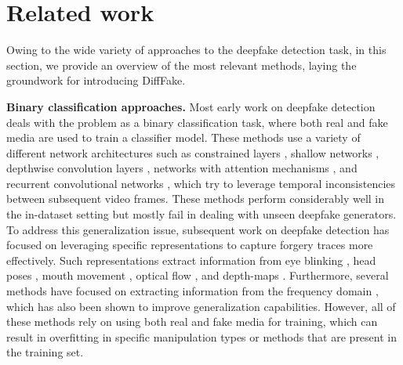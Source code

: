 \section{Related work}
Owing to the wide variety of approaches to the deepfake detection task, in this section, we provide an overview of the most relevant methods, laying the groundwork for introducing DiffFake. 



\noindent\textbf{Binary classification approaches.} Most early work on deepfake detection deals with the problem as a binary classification task, where both real and fake media are used to train a classifier model. These methods use a variety of different network architectures such as constrained layers \cite{bayar2016deep_constrained_layers}, shallow networks \cite{afchar2018mesonet}, depthwise convolution layers \cite{rossler2019faceforensics++}, networks with attention mechanisms \cite{dang2020detection_attention,zhao2021multi}, and recurrent convolutional networks \cite{sabir2019recurrent,guera2018deepfake_recurrent}, which try to leverage temporal inconsistencies between subsequent video frames. These methods perform considerably well in the in-dataset setting but mostly fail in dealing with unseen deepfake generators. To address this generalization issue, subsequent work on deepfake detection has focused on leveraging specific representations to capture forgery traces more effectively. Such representations extract information from eye blinking \cite{jung2020blinking}, head poses \cite{yang2019head_poses}, mouth movement \cite{haliassos2021lips}, optical flow \cite{amerini2019optical_flow}, and depth-maps \cite{maiano2022depthfake}. Furthermore, several methods have focused on extracting information from the frequency domain \cite{zhang2019detecting_freq,frank2020leveraging_freq,qian2020thinking_in_freq,liu2021spatial_phase_freq,luo2021generalizing_freq}, which has also been shown to improve generalization capabilities. However, all of these methods rely on using both real and fake media for training, which can result in overfitting in specific manipulation types or methods that are present in the training set.

